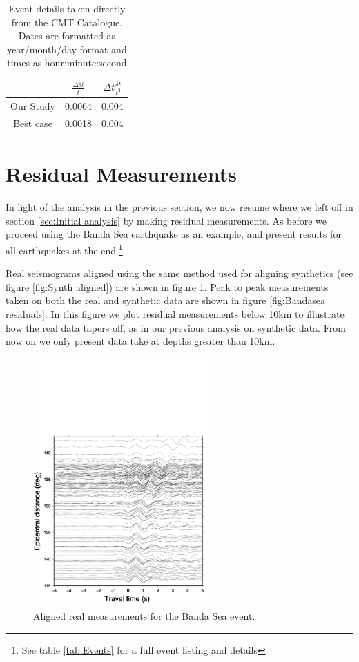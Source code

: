 \documentclass[11pt,a4paper]{article}
\begin{document}
\begin{table}
\centering
\begin{tabular}{| c | c | c |}
	\hline
	 		& $\frac{\Delta \delta t}{t}$	& $\Delta t \frac{\delta t}{t^{2}}$	\\ \hline
	Our Study	& 0.0064				& 0.004	 				\\\hline
	Best case	& 0.0018				& 0.004					\\
	\hline
\end{tabular}
\caption{Event details taken directly from the CMT Catalogue. Dates are formatted as year/month/day format and times as hour:minute:second}
\end{table}

\section{Residual Measurements}

In light of the analysis in the previous section, we now resume where we left off in section \ref{sec:Initial analysis} by making residual measurements. As before we proceed using the Banda Sea earthquake as an example, and present results for all earthquakes at the end.\footnote{See table \ref{tab:Events} for a full event listing and details}

Real seismograms aligned using the same method used for aligning synthetics (see figure \ref{fig:Synth aligned}) are shown in figure \ref{fig:Bandasea real aligned}. Peak to peak measurements taken on both the real and synthetic data are shown in figure \ref{fig:Bandasea residuals}. In this figure we plot residual measurements below 10km to illustrate how the real data tapers off, as in our previous analysis on synthetic data. From now on we only present data take at depths greater than 10km.

\begin{figure}
	\centering
	\includegraphics[width=0.6\textwidth]{figures/bandasea/bandasea_real_aligned}
	\caption{Aligned real measurements for the Banda Sea event.}
	\label{fig:Bandasea real aligned}
\end{figure}
\end{document}
